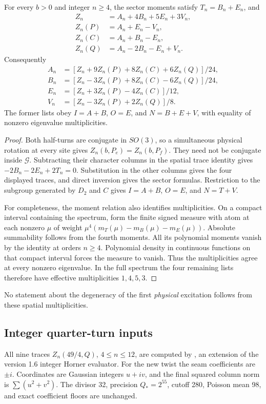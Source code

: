 \begin{lemma}\label{lem:octahedral}
For every $b>0$ and integer $n\ge4$, the sector moments satisfy
$T_n=B_n+E_n$, and
\begin{align*}
 Z_n&=A_n+4B_n+5E_n+3V_n,\\
 Z_n(P)&=A_n+E_n-V_n,\\
 Z_n(C)&=A_n+B_n-E_n,\\
 Z_n(Q)&=A_n-2B_n-E_n+V_n.
\end{align*}
Consequently
\begin{align*}
 A_n&=[Z_n+9Z_n(P)+8Z_n(C)+6Z_n(Q)]/24,\\
 B_n&=[Z_n-3Z_n(P)+8Z_n(C)-6Z_n(Q)]/24,\\
 E_n&=[Z_n+3Z_n(P)-4Z_n(C)]/12,\\
 V_n&=[Z_n-3Z_n(P)+2Z_n(Q)]/8.
\end{align*}
The former lists obey $I=A+B$, $O=E$, and $N=B+E+V$,
with equality of nonzero eigenvalue multiplicities.
\end{lemma}
\begin{proof}
Both half-turns are conjugate in $SO(3)$, so a simultaneous physical
rotation at every site gives $Z_n(b,P_e)=Z_n(b,P_f)$.
They need not be conjugate inside $\mathcal G$.
Subtracting their character columns in the spatial trace identity
gives $-2B_n-2E_n+2T_n=0$. Substitution in the other columns gives the
four displayed traces, and direct inversion gives the sector formulas.
Restriction to the subgroup generated by $D_2$ and $C$ gives
$I=A+B$, $O=E$, and $N=T+V$.

For completeness, the moment relation also identifies multiplicities.
On a compact interval containing the spectrum, form the finite signed
measure with atom at each nonzero $\mu$ of weight
$\mu^4(m_T(\mu)-m_B(\mu)-m_E(\mu))$.
Absolute summability follows from the fourth moments. All its polynomial
moments vanish by the identity at orders $n\ge4$.
Polynomial density in continuous functions on that compact interval
forces the measure to vanish. Thus the multiplicities agree at every
nonzero eigenvalue. In the full spectrum the four remaining lists
therefore have effective multiplicities $1,4,5,3$.
\end{proof}
No statement about the degeneracy of the first \emph{physical}
excitation follows from these spatial multiplicities.

\subsection{Integer quarter-turn inputs}
All nine traces $Z_n(49/4,Q)$, $4\le n\le12$, are computed by
, an extension of the version 1.6
integer Horner evaluator. For the new twist the seam coefficients are
$\pm i$. Coordinates are Gaussian integers $u+iv$, and the final squared
column norm is $\sum(u^2+v^2)$.
The divisor 32, precision $Q_*=2^{55}$, cutoff 280, Poisson mean 98,
and exact coefficient floors are unchanged.

